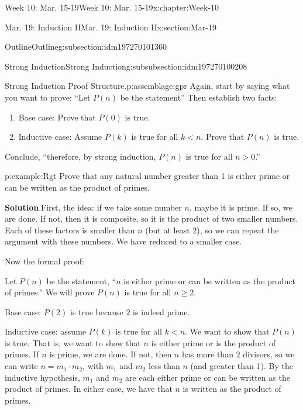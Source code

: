 \documentclass[oneside,10pt,]{book}
\newcommand{\blocktitlefont}{\relax}
\numberwithin{equation}{section}
\renewcommand{\ge}{\geqslant}
\newcommand{\lt}{<}
\newcommand{\gt}{>}
\begin{document}
\begin{chapterptx}{Week 10: Mar. 15-19}{}{Week 10: Mar. 15-19}{}{}{x:chapter:Week-10}
\begin{sectionptx}{Mar. 19: Induction II}{}{Mar. 19: Induction II}{}{}{x:section:Mar-19}
\begin{subsectionptx}{Outline}{}{Outline}{}{}{g:subsection:idm197270101360}
%
%
\typeout{************************************************}
\typeout{************************************************}
%
\begin{subsubsectionptx}{Strong Induction}{}{Strong Induction}{}{}{g:subsubsection:idm197270100208}
\begin{assemblage}{Strong Induction Proof Structure.}{p:assemblage:gpr}%
Again, start by saying what you want to prove: ``Let \(P(n)\) be the statement\textellipsis{}'' Then establish two facts:%
\begin{enumerate}
\item{}Base case: Prove that \(P(0)\) is true. %
\item{}Inductive case: Assume \(P(k)\) is true for all \(k \lt n\). Prove that \(P(n)\) is true. %
\end{enumerate}
Conclude, ``therefore, by strong induction, \(P(n)\) is true for all \(n \gt 0\).''%
\end{assemblage}
\begin{example}{}{p:example:Rgt}%
Prove that any natural number greater than 1 is either prime  or can be written as the product of primes.%
\par\smallskip%
\noindent\textbf{\blocktitlefont Solution}.\hypertarget{p:solution:usW}{}\quad{}First, the idea: if we take some number \(n\), maybe it is prime. If so, we are done. If not, then it is composite, so it is the product of two smaller numbers. Each of these factors is smaller than \(n\) (but at least 2), so we can repeat the argument with these numbers. We have reduced to a smaller case.%
\par
Now the formal proof:%
\par
Let \(P(n)\) be the statement, ``\(n\) is either prime or can be written as the product of primes.'' We will prove \(P(n)\) is true for all \(n \ge 2\).%
\par
Base case: \(P(2)\) is true because \(2\) is indeed prime.%
\par
Inductive case: assume \(P(k)\) is true for all \(k \lt n\). We want to show that \(P(n)\) is true. That is, we want to show that \(n\) is either prime or is the product of primes. If \(n\) is prime, we are done. If not, then \(n\) has more than 2 divisors, so we can write \(n = m_1 \cdot m_2\), with \(m_1\) and \(m_2\) less than \(n\) (and greater than 1). By the inductive hypothesis, \(m_1\) and \(m_2\) are each either prime or can be written as the product of primes. In either case, we have that \(n\) is written as the product of primes.%

\end{example}
\end{subsubsectionptx}
\end{subsectionptx}
\end{sectionptx}
\end{chapterptx}
\end{document}
